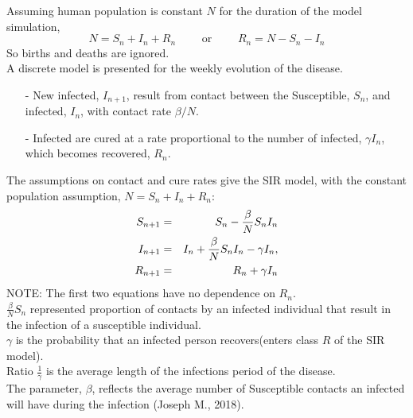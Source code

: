 \documentclass[12pt]{report}
\newcommand{\sps}{\\[0.2cm]}
\newcommand{\NI}{\noindent}
\newcommand{\dsp}{\displaystyle}
\begin{document}
	\NI Assuming human population is constant $N$ for the duration of the model simulation,
	\begin{equation*}
		N = S_n + I_n + R_n \qquad \text{ or }\qquad R_n = N-S_n-I_n
	\end{equation*}
	So births and deaths are ignored.\sps
	
	\NI A discrete model is presented for the weekly evolution of the disease.\sps 
	\begin{itemize}
		\item[-] New infected, $I_{n+1}$, result from contact between the Susceptible, $S_n$, and infected, $I_n$, with contact rate $\beta/N$.
		
		\item[-] Infected are cured at a rate proportional to the number of infected, $\gamma I_n$, which becomes recovered, $R_n$.
	\end{itemize}
	The assumptions on contact and cure rates give the SIR model, with the constant population assumption, $N=S_n + I_n + R_n$: 
	\begin{eqnarray}
		S_{n+1} &=& S_n - \frac{\beta}{N}S_nI_n\notag\\
		I_{n+1} &=& I_n + \frac{\beta}{N}S_nI_n - \gamma I_n, \notag\\
		R_{n+1} &=& R_n + \gamma I_n\notag
	\end{eqnarray}
	NOTE: The first two equations have no dependence on $R_n$.\sps
	$\dsp \frac{\beta}{N}S_n$ represented proportion of contacts by an infected individual that result in the infection of a susceptible individual.\sps
	$\gamma$ is the probability that an infected person recovers(enters class $R$ of the SIR model).\sps
	Ratio $\dsp \frac{1}{\gamma}$ is the average length of the infections period of the disease.\sps
	The parameter, $\beta$, reflects the average number of Susceptible contacts an infected will have during the infection (Joseph M., 2018).\sps
	
\end{document}
